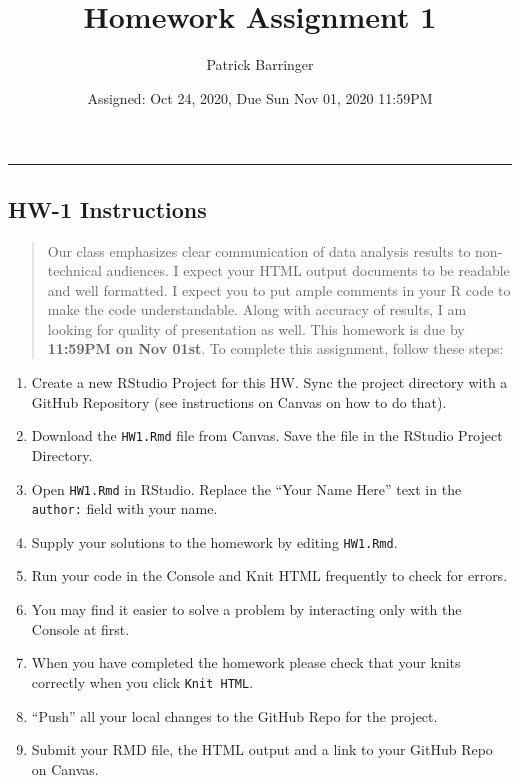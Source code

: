 \documentclass[
]{article}
\title{Homework Assignment 1}
\author{Patrick Barringer}
\date{Assigned: Oct 24, 2020, Due Sun Nov 01, 2020 11:59PM}
\begin{document}
\maketitle

\begin{center}\rule{0.5\linewidth}{0.5pt}\end{center}

\hypertarget{hw-1-instructions}{%
\subsection{HW-1 Instructions}\label{hw-1-instructions}}

\begin{quote}
Our class emphasizes clear communication of data analysis results to
non-technical audiences. I expect your HTML output documents to be
readable and well formatted. I expect you to put ample comments in your
R code to make the code understandable. Along with accuracy of results,
I am looking for quality of presentation as well. This homework is due
by \textbf{11:59PM on Nov 01st}. To complete this assignment, follow
these steps:
\end{quote}

\begin{enumerate}
\def\labelenumi{\arabic{enumi}.}
\item
  Create a new RStudio Project for this HW. Sync the project directory
  with a GitHub Repository (see instructions on Canvas on how to do
  that).
\item
  Download the \texttt{HW1.Rmd} file from Canvas. Save the file in the
  RStudio Project Directory.
\item
  Open \texttt{HW1.Rmd} in RStudio. Replace the ``Your Name Here'' text
  in the \texttt{author:} field with your name.
\item
  Supply your solutions to the homework by editing \texttt{HW1.Rmd}.
\item
  Run your code in the Console and Knit HTML frequently to check for
  errors.
\item
  You may find it easier to solve a problem by interacting only with the
  Console at first.
\item
  When you have completed the homework please check that your knits
  correctly when you click \texttt{Knit\ HTML}.
\item
  ``Push'' all your local changes to the GitHub Repo for the project.
\item
  Submit your RMD file, the HTML output and a link to your GitHub Repo
  on Canvas.
\end{enumerate}
\end{document}
